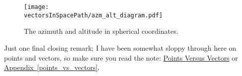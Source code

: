 {\begin{figure}
\label{figure:azm_alt}
\begin{center}
\texttt{[image: \\vectorsInSpacePath/azm\_alt\_diagram.pdf]}
\end{center}
\caption{The azimuth and altitude in spherical coordinates.}
\end{figure}

Just one final closing remark; I have been somewhat sloppy through here on points and vectors, so make sure you read the note: \hyperlink{note_points_versus_vectors}{Points Versus Vectors} or \hyperref[points_vs_vectors]{Appendix~\ref*{points_vs_vectors}}.

} %

\newpage
